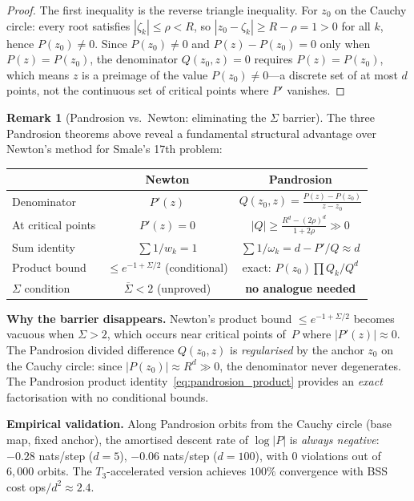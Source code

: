 \documentclass[11pt,a4paper]{article}
\theoremstyle{definition}
\newtheorem{remark}{Remark}[section]
\begin{document}
\begin{proof}
The first inequality is the reverse triangle inequality.  For $z_0$ on the Cauchy circle: every root satisfies $|\zeta_k| \leq \rho < R$, so $|z_0 - \zeta_k| \geq R - \rho = 1 > 0$ for all $k$, hence $P(z_0) \neq 0$.  Since $P(z_0) \neq 0$ and $P(z) - P(z_0) = 0$ only when $P(z) = P(z_0)$, the denominator $Q(z_0,z) = 0$ requires $P(z) = P(z_0)$, which means $z$ is a preimage of the value $P(z_0) \neq 0$---a discrete set of at most $d$ points, not the continuous set of critical points where $P'$ vanishes.
\end{proof}

\begin{remark}[Pandrosion vs.\ Newton: eliminating the $\Sigma$ barrier]
\label{rem:pandrosion_vs_newton}
The three Pandrosion theorems above reveal a fundamental structural advantage over Newton's method for Smale's 17th problem:

\begin{center}
\renewcommand{\arraystretch}{1.3}
\begin{tabular}{lcc}
\toprule
& \textbf{Newton} & \textbf{Pandrosion} \\
\midrule
Denominator       & $P'(z)$    & $Q(z_0,z) = \frac{P(z)-P(z_0)}{z-z_0}$ \\
At critical points & $P'(z)=0$ & $|Q| \geq \frac{R^d-(2\rho)^d}{1+2\rho} \gg 0$ \\
Sum identity      & $\sum 1/w_k = 1$ & $\sum 1/\omega_k = d - P'/Q \approx d$ \\
Product bound     & $\leq e^{-1+\Sigma/2}$ (conditional) & exact: $P(z_0)\prod Q_k/Q^d$ \\
$\Sigma$ condition & $\overline{\Sigma}<2$ (unproved) & \textbf{no analogue needed} \\
\bottomrule
\end{tabular}
\end{center}

\medskip
\noindent\textbf{Why the barrier disappears.}
Newton's product bound $\leq e^{-1+\Sigma/2}$ becomes vacuous when $\Sigma > 2$, which occurs near critical points of~$P$ where $|P'(z)| \approx 0$.  The Pandrosion divided difference $Q(z_0,z)$ is \emph{regularised} by the anchor $z_0$ on the Cauchy circle: since $|P(z_0)| \approx R^d \gg 0$, the denominator never degenerates.  The Pandrosion product identity~\eqref{eq:pandrosion_product} provides an \emph{exact} factorisation with no conditional bounds.

\medskip
\noindent\textbf{Empirical validation.}
Along Pandrosion orbits from the Cauchy circle (base map, fixed anchor), the amortised descent rate of $\log|P|$ is \emph{always negative}: $-0.28$ nats/step ($d=5$), $-0.06$ nats/step ($d=100$), with $0$ violations out of $6{,}000$ orbits.  The $T_3$-accelerated version achieves $100\%$ convergence with BSS cost ops$/d^2 \approx 2.4$.
\end{remark}
\end{document}
